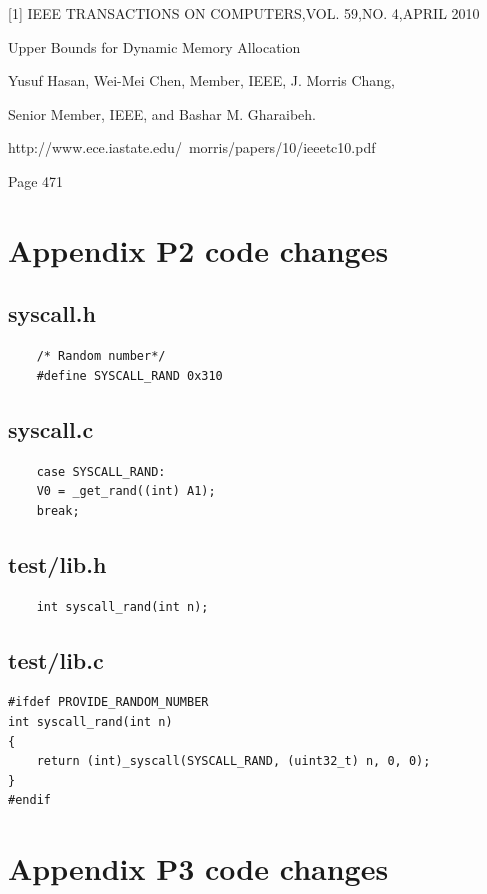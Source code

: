 \documentclass[a4paper,12pt,danish]{report}
\begin{document}
 [1] IEEE TRANSACTIONS ON COMPUTERS,VOL. 59,NO. 4,APRIL 2010
 
 Upper Bounds for Dynamic Memory Allocation
 
 Yusuf Hasan, Wei-Mei Chen, Member, IEEE, J. Morris Chang,
 
 Senior Member, IEEE, and Bashar M. Gharaibeh.
 
http://www.ece.iastate.edu/~morris/papers/10/ieeetc10.pdf

Page 471

\newpage
\section{Appendix P2 code changes}
\subsection{syscall.h}
\begin{lstlisting}
  	/* Random number*/
	#define SYSCALL_RAND 0x310
  \end{lstlisting}
\subsection{syscall.c}
  \begin{lstlisting}
  	case SYSCALL_RAND:
	V0 = _get_rand((int) A1);
	break;
  \end{lstlisting}
  	
\subsection{test/lib.h}
   \begin{lstlisting}
	int syscall_rand(int n);
   \end{lstlisting} 


\subsection{test/lib.c}
\begin{lstlisting}
#ifdef PROVIDE_RANDOM_NUMBER
int syscall_rand(int n)
{
  	return (int)_syscall(SYSCALL_RAND, (uint32_t) n, 0, 0);
}
#endif
    \end{lstlisting} 

\newpage
\section{Appendix P3  code changes}
\end{document}

